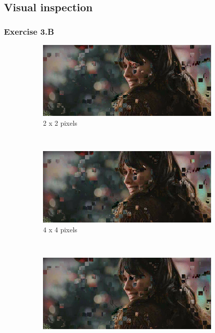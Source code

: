 \documentclass[a4paper,11pt,oneside]{article}
\begin{document}
\vspace{-0.5cm}
\subsection{Visual inspection}
\vspace{-0.5cm}
\subsubsection*{Exercise 3.B}
\begin{figure}[H]
        \begin{subfigure}[h]{0.5\textwidth}
                \includegraphics[width=\textwidth]{img/3B_2.png}
                \caption{2 x 2 pixels}\label{subfig:2}
        \end{subfigure}%
        ~
        \begin{subfigure}[h]{0.5\textwidth}
                \includegraphics[width=\textwidth]{img/3B_4.png}
                \caption{4 x 4 pixels}\label{subfig:4}
        \end{subfigure}
        ~
        \begin{subfigure}[h]{0.5\textwidth}
                \includegraphics[width=\textwidth]{img/3B_8.png}

\end{subfigure}
\end{figure}
\end{document}
